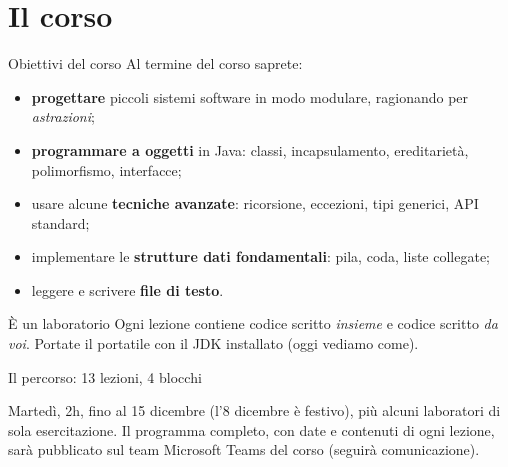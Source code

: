 \documentclass[10pt,aspectratio=169]{beamer}
\begin{document}
\section{Il corso}

\begin{frame}{Obiettivi del corso}
Al termine del corso saprete:
\begin{itemize}
    \item \textbf{progettare} piccoli sistemi software in modo modulare, ragionando per \emph{astrazioni};
    \item \textbf{programmare a oggetti} in Java: classi, incapsulamento, ereditarietà, polimorfismo, interfacce;
    \item usare alcune \textbf{tecniche avanzate}: ricorsione, eccezioni, tipi generici, API standard;
    \item implementare le \textbf{strutture dati fondamentali}: pila, coda, liste collegate;
    \item leggere e scrivere \textbf{file di testo}.
\end{itemize}

\vspace{0.3cm}
\begin{block}{È un laboratorio}
Ogni lezione contiene codice scritto \emph{insieme} e codice scritto \emph{da voi}. Portate il portatile con il JDK installato (oggi vediamo come).
\end{block}
\end{frame}

\begin{frame}[fragile]{Il percorso: 13 lezioni, 4 blocchi}

\vspace{0.2cm}
\small Martedì, 2h, fino al 15 dicembre (l'8 dicembre è festivo), più alcuni laboratori di sola esercitazione. Il programma completo, con date e contenuti di ogni lezione, sarà pubblicato sul team Microsoft Teams del corso (seguirà comunicazione).
\end{frame}
\end{document}
